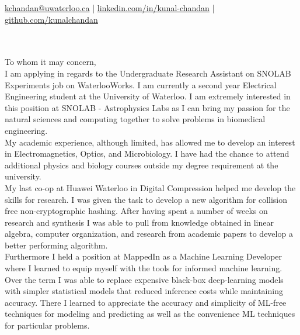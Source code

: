 \documentclass[]{chandan-cv}
\begin{document}
%
%

%
%
{
	\href{mailto:kchandan@uwaterloo.ca}{kchandan@uwaterloo.ca} \qquad
	| \qquad
	\href{https://www.linkedin.com/in/kunal-chandan/}{linkedin.com/in/kunal-chandan} \qquad
	| \qquad
	\href{http://github.com/kunalchandan}{github.com/kunalchandan}
}

\begin{minipage}[t]{0.2\textwidth}
\end{minipage}
\begin{minipage}[t]{0.8\textwidth}
\\
\vspace{10pt}
\large
\\
To whom it may concern,\\


\qquad I am applying in regards to the Undergraduate Research Assistant on SNOLAB Experiments job on WaterlooWorks.
I am currently a second year Electrical Engineering student at the University of Waterloo. 
I am extremely interested in this position at SNOLAB - Astrophysics Labs as I can bring my passion for the natural sciences and computing together to solve problems in biomedical engineering.
\\


\qquad My academic experience, although limited, has allowed me to develop an interest in Electromagnetics, Optics, and Microbiology.
I have had the chance to attend additional physics and biology courses outside my degree requirement at the university. 
\\

\qquad My last co-op at Huawei Waterloo in Digital Compression helped me develop the skills for research. 
I was given the task to develop a new algorithm for collision free non-cryptographic hashing. 
After having spent a number of weeks on research and synthesis I was able to pull from knowledge obtained in linear algebra, computer organization, and research from academic papers to develop a better performing algorithm.
\\

\qquad Furthermore I held a position at MappedIn as a Machine Learning Developer where I learned to equip myself with the tools for informed machine learning. 
Over the term I was able to replace expensive black-box deep-learning models with simpler statistical models that reduced inference costs while maintaining accuracy. 
There I learned to appreciate the accuracy and simplicity of ML-free techniques for modeling and predicting as well as the convenience ML techniques for particular problems. 
\\



\end{minipage}
\end{document}

